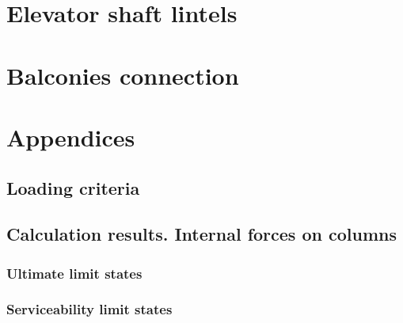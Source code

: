 \section{Elevator shaft lintels}


%

\section{Balconies connection}


\newpage
\appendix
\section*{Appendices}
\renewcommand{\thesubsection}{\Alph{subsection}}

\subsection{Loading criteria} \label{loadCrit}


\newpage
\subsection{Calculation results. Internal forces on columns}\label{sc_column_internal_forces}
\subsubsection{Ultimate limit states}

\clearpage
\newpage
\subsubsection{Serviceability limit states}


